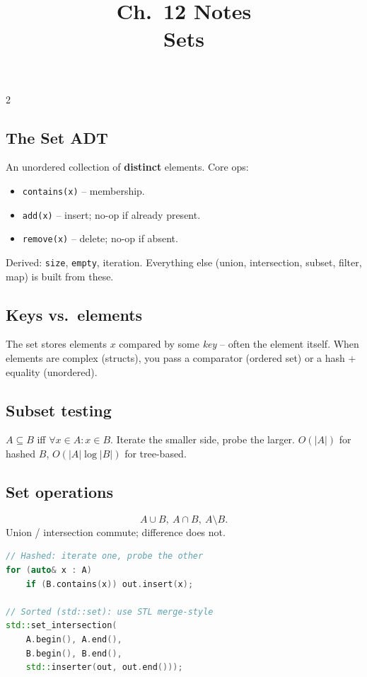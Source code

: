 \documentclass[10pt]{article}
\title{Ch.~12 Notes\\\large Sets}
\author{}
\date{}
\begin{document}
\maketitle
\vspace{-2em}

\begin{multicols}{2}

\subsection*{The Set ADT}
An unordered collection of \textbf{distinct} elements. Core ops:
\begin{itemize}
    \item \texttt{contains(x)} -- membership.
    \item \texttt{add(x)} -- insert; no-op if already present.
    \item \texttt{remove(x)} -- delete; no-op if absent.
\end{itemize}
Derived: \texttt{size}, \texttt{empty}, iteration. Everything else
(union, intersection, subset, filter, map) is built from these.

\subsection*{Keys vs.\ elements}
The set stores elements $x$ compared by some \emph{key} -- often the
element itself. When elements are complex (structs), you pass a
comparator (ordered set) or a hash + equality (unordered).

\subsection*{Subset testing}
$A \subseteq B$ iff $\forall x \in A : x \in B$. Iterate the smaller
side, probe the larger. $O(|A|)$ for hashed $B$, $O(|A| \log |B|)$
for tree-based.

\subsection*{Set operations}
\[
A \cup B,\ A \cap B,\ A \setminus B.
\]
Union / intersection commute; difference does not.

\begin{lstlisting}[language=C++]
// Hashed: iterate one, probe the other
for (auto& x : A)
    if (B.contains(x)) out.insert(x);

// Sorted (std::set): use STL merge-style
std::set_intersection(
    A.begin(), A.end(),
    B.begin(), B.end(),
    std::inserter(out, out.end()));
\end{lstlisting}


\end{multicols}
\end{document}
